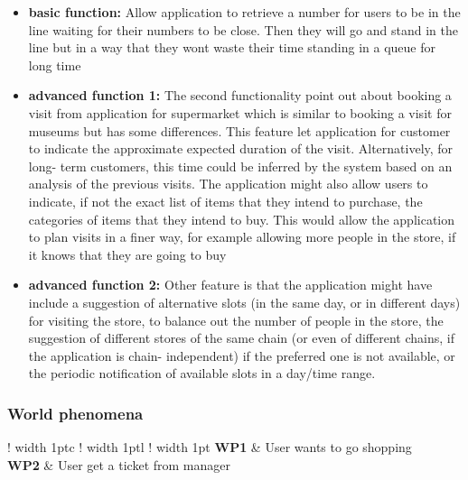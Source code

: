 \begin{itemize}
\item \textbf{basic function:} Allow application to retrieve a number for users to be in the line waiting for their numbers to be close. Then they will go and stand in the line but in a way that they wont waste their time standing in a queue for long time
\item \textbf{advanced function 1:} The second functionality point out about booking a visit from application for supermarket which is similar to booking a visit for museums but has some differences. This feature let application for customer to indicate the approximate expected duration of the visit. Alternatively, for long- 
term customers, this time could be inferred by the system based on an analysis of the previous visits.  
The application might also allow users to indicate, if not the exact list of items that they intend to  
purchase, the categories of items that they intend to buy. This would allow the application to plan visits  
in a finer way, for example allowing more people in the store, if it knows that they are going to buy
\item \textbf{advanced function 2:} Other feature is that the application might have include a suggestion of alternative slots (in the same  
day, or in different days) for visiting the store, to balance out the number of people in the store, the  
suggestion of different stores of the same chain (or even of different chains, if the application is chain- 
independent) if the preferred one is not available, or the periodic notification of available slots in a  
day/time range.
\end{itemize}


\subsubsection{World phenomena}
\newcommand{\Vline}{\color{tableBorderColor} \vrule width 1pt}
\def\arraystretch{1.5}

\setlength\arrayrulewidth{1pt}
\setlength\LTleft{0pt}

\begin{longtable}{!\Vline c !\Vline l !\Vline} 
    \hline
    \textbf{WP1} & User wants to go shopping  \\
    \textbf{WP2} & User get a ticket from manager  \\  \hline
\end{longtable}

